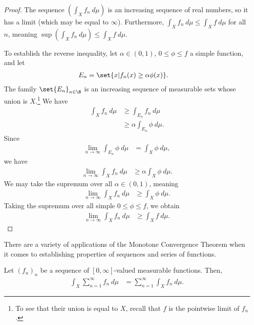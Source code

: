 \documentclass[10pt]{mypackage}
\begin{document}
\begin{proof}
  The sequence $\left( \int_{X}f_n\:d\mu \right)$ is an increasing sequence of real numbers, so it has a limit (which may be equal to $\infty$). Furthermore, $\int_{X}f_n\:d\mu \leq \int_{X}f\:d\mu$ for all $n$, meaning $\sup \left( \int_{X}^{} f_n\:d\mu \right) \leq \int_{X}^{} f\:d\mu$.\newline

  To establish the reverse inequality, let $\alpha\in (0,1)$, $0\leq \phi \leq f$ a simple function, and let
  \begin{align*}
    E_n &= \set{x | f_n(x) \geq \alpha \phi(x)}.
  \end{align*}
  The family $\set{E_n}_{n\in\N}$ is an increasing sequence of measurable sets whose union is $X$.\footnote{To see that their union is equal to $X$, recall that $f$ is the pointwise limit of $f_n$.} We have
  \begin{align*}
    \int_{X}^{} f_n\:d\mu &\geq \int_{E_n}^{} f_n\:d\mu\\
                          &\geq \alpha \int_{E_n}^{} \phi\:d\mu.
  \end{align*}
  Since
  \begin{align*}
    \lim_{n\rightarrow\infty} \int_{E_n}^{} \phi\:d\mu &= \int_{X}^{} \phi\:d\mu,
  \end{align*}
  we have
  \begin{align*}
    \lim_{n\rightarrow\infty} \int_{X}^{} f_n\:d\mu &\geq \alpha \int_{X}^{} \phi\:d\mu.
  \end{align*}
  We may take the supremum over all $\alpha\in (0,1)$, meaning
  \begin{align*}
    \lim_{n\rightarrow\infty} \int_{X}^{} f_n\:d\mu &\geq \int_{X}^{} \phi\:d\mu.
  \end{align*}
  Taking the supremum over all simple $0\leq \phi \leq f$, we obtain
  \begin{align*}
    \lim_{n\rightarrow\infty} \int_{X}^{} f_n\:d\mu &\geq \int_{X}^{} f\:d\mu.
  \end{align*}
\end{proof}
There are a variety of applications of the Monotone Convergence Theorem when it comes to establishing properties of sequences and series of functions.
\begin{theorem}
  Let $\left( f_n \right)_n$ be a sequence of $[0,\infty]$-valued measurable functions. Then,
  \begin{align*}
    \int_{X}^{} \sum_{n=1}^{\infty}f_n\:d\mu &= \sum_{n=1}^{\infty} \int_{X}^{} f_n\:d\mu.
  \end{align*}
\end{theorem}
\end{document}
